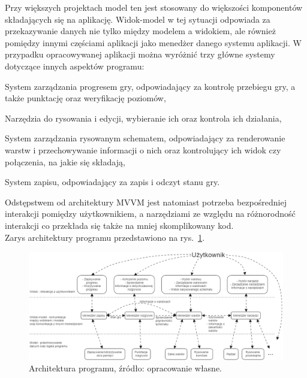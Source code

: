 Przy większych projektach model ten jest stosowany do większości komponentów składających się na aplikację.
Widok-model w tej sytuacji odpowiada za przekazywanie danych nie tylko między modelem a widokiem,
ale również pomiędzy innymi częściami aplikacji jako menedżer danego systemu aplikacji.
W przypadku opracowywanej aplikacji można wyróżnić trzy główne systemy dotyczące innych aspektów programu:

\begin{citemize}
    \item System zarządzania progresem gry, odpowiadający za kontrolę przebiegu gry,
    a także punktację oraz weryfikację poziomów,
    \item Narzędzia do rysowania i edycji, wybieranie ich oraz kontrola ich działania,
    \item System zarządzania rysowanym schematem,
    odpowiadający za renderowanie warstw i przechowywanie informacji o nich
    oraz kontrolujący ich widok czy połączenia, na jakie się składają,
    \item System zapisu, odpowiadający za zapis i odczyt stanu gry.
\end{citemize}

Odstępstwem od architektury MVVM jest natomiast potrzeba bezpośredniej interakcji pomiędzy użytkownikiem,
a narzędziami ze względu na różnorodność interakcji co przekłada się także na mniej skomplikowany kod.\\
Zarys architektury programu przedstawiono na rys.~\ref{fig:architektura}.

\begin{figure}[h!]
    \centering
    \includegraphics[width=\textwidth]{chapters/chapter3/rys/arch}
    \caption[Architektura programu.]{Architektura programu, źródło: opracowanie własne.}
    \label{fig:architektura}
\end{figure}

